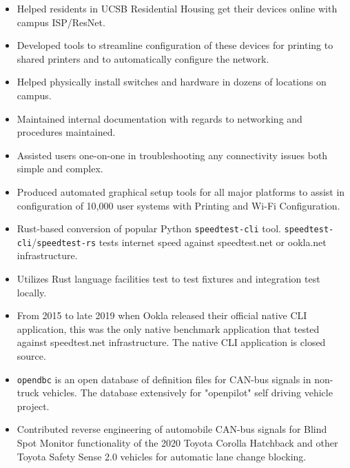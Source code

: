 \documentclass[10pt,letter,ragged2e]{altacv}
\begin{document}
\begin{paracol}{2}
\begin{itemize}
\item Helped residents in UCSB Residential Housing get their devices online with campus ISP/ResNet. 
\item Developed tools to streamline configuration of these devices for
printing to shared printers and to automatically configure the network. \item Helped physically install switches and hardware in dozens of locations on campus.
\item Maintained internal documentation with regards to networking and procedures maintained. 
\item Assisted users one-on-one in troubleshooting any connectivity
issues both simple and complex. 
\item Produced automated graphical setup tools for all major platforms to assist in configuration of 10,000 user systems with
Printing and Wi-Fi Configuration.
\end{itemize}



\begin{itemize}
\item Rust-based conversion of popular Python \texttt{speedtest-cli} tool. \texttt{speedtest-cli}/\texttt{speedtest-rs} tests internet speed against speedtest.net or ookla.net infrastructure.
\item Utilizes Rust language facilities test to test fixtures and integration test locally.
\item From 2015 to late 2019 when Ookla released their official native CLI application, this was the only native benchmark application that tested against speedtest.net infrastructure. The native CLI application is closed source.
\end{itemize}

\divider


\begin{itemize}
\item \texttt{opendbc} is an open database of definition files for CAN-bus signals in non-truck vehicles. The database extensively for "openpilot" self driving vehicle project.
\item Contributed reverse engineering of automobile CAN-bus signals for Blind Spot Monitor functionality of the 2020 Toyota Corolla Hatchback and other Toyota Safety Sense 2.0 vehicles for automatic lane change blocking.
\end{itemize}


\end{paracol}
\end{document}

